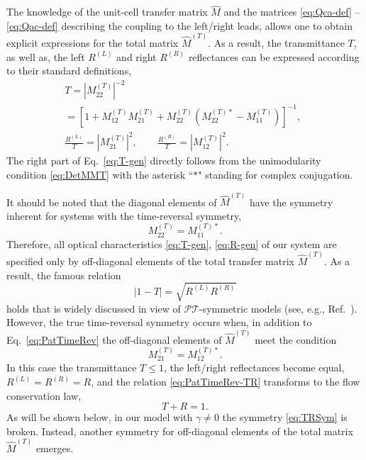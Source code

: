 \documentclass[aps,pra,reprint,showpacs,bibnotes,preprintnumbers,twoside,eqsecnum]{revtex4-1}
\begin{document}
The knowledge of the unit-cell transfer matrix $\hat{M}$ and the matrices \eqref{eq:Qca-def} -- \eqref{eq:Qac-def} describing the coupling to the left/right leads, allows one to obtain explicit expressions for the total matrix $\hat{M}^{(T)}$. As a result, the transmittance $T$, as well as, the left $R^{(L)}$ and right $R^{(R)}$ reflectances can be expressed according to their standard definitions,
%
\begin{eqnarray}
&&T=\left|M^{(T)}_{22}\right|^{-2}\nonumber\\
&&=\left[1+M^{(T)}_{12}M^{(T)}_{21}+M^{(T)}_{22}\left(M^{(T)*}_{22}-M^{(T)}_{11}\right)\right]^{-1},\qquad\label{eq:T-gen}\\[6pt]
&&\frac{R^{(L)}}{T} =\left|M^{(T)}_{21}\right|^2 ,\qquad\frac{R^{(R)}}{T} =\left|M^{(T)}_{12}\right|^2.\qquad\label{eq:R-gen}
\end{eqnarray}
The right part of Eq.~\eqref{eq:T-gen} directly follows from the unimodularity condition \eqref{eq:DetMMT} with the asterisk ``$*$" standing for complex conjugation.

It should be noted that the diagonal elements of $\hat{M}^{(T)}$ have the symmetry inherent for systems with the time-reversal symmetry,
%
\begin{equation}\label{eq:PatTimeRev}
M^{(T)}_{22}=M^{(T)*}_{11}.
\end{equation}
Therefore, all optical characteristics \eqref{eq:T-gen}, \eqref{eq:R-gen} of our system are specified only by off-diagonal elements of the total transfer matrix $\hat{M}^{(T)}$. As a result, the famous relation
%
\begin{equation}\label{eq:PatTimeRev-TR}
\left|1-T\right|=\sqrt{R^{(L)}R^{(R)}}
\end{equation}
holds that is widely discussed in view of $\mathcal{P}\mathcal{T}$-symmetric models (see, e.g., Ref.~\cite{GCS12}). However, the true time-reversal symmetry occurs when, in addition to Eq.~\eqref{eq:PatTimeRev} the off-diagonal elements of $\hat{M}^{(T)}$ meet the condition
%
\begin{equation}\label{eq:TRSym}
M^{(T)}_{21}=M^{(T)*}_{12}.
\end{equation}
In this case the transmittance $T\leqslant1$, the left/right reflectances become equal, $R^{(L)}=R^{(R)}=R$, and the relation \eqref{eq:PatTimeRev-TR} transforms to the flow conservation law,
%
\begin{equation}\label{eq:FlConsLaw}
T+R=1.
\end{equation}
As will be shown below, in our model with $\gamma\neq0$ the symmetry \eqref{eq:TRSym} is broken. Instead, another symmetry for off-diagonal elements of the total matrix $\hat{M}^{(T)}$ emerges.
\end{document}
